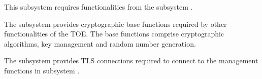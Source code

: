 


This subsystem requires functionalities from the subsystem
.



The subsystem  provides cryptographic base functions
required by other functionalities of the TOE. The base functions comprise
cryptographic algorithms, key management and random number generation.






The subsystem  provides TLS connections required to connect
to the management functions in subsystem .





